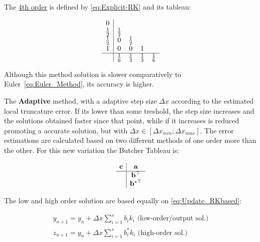 The \underline{ 4th order} is defined by \ref{eq:Explicit-RK} and its tableau:

\begin{equation}
    \begin{array}{c|cccc}
        0\\
        \frac{1}{2} & \frac{1}{2}\\
        \frac{1}{2} & 0 & \frac{1}{2} \\
        1 & 0 & 0 & 1\\
        \hline
        & \frac{1}{6} & \frac{1}{3} & \frac{1}{3} & \frac{1}{6}  
    \end{array}
    \label{eq:RK4_Tableu}
\end{equation}

Although this method solution is slower comparatively to Euler~\ref{eq:Euler_Method}, its accuracy is higher. \par
The \textbf{Adaptive } \label{subsubsub:RK_Adaptive} method, with a adaptive step size \(\Delta x\) according to the estimated local truncature error. If its lower than some treshold, the step size increases and the solutions obtained faster since that point, while if it increases is reduced promoting a accurate solution, but with \(\Delta x \in [\Delta x_{min}; \Delta x_{max}]\).  The error estimations are calculated based on two different methods of one order more than the other. For this new  variation the Butcher Tableau is: 


\begin{equation} 
    \begin{array}{c|c}
        \mathbf{c} & \mathbf{a} \\
        \hline
        & \mathbf{b}^\top  \\
        & \mathbf{b}^{*\top }
    \end{array}
    \label{eq:Explicit_Butcher_Tableu}
\end{equation}


The low and high order solution are based equally on \ref{eq:Update_RKbased}:

\begin{subequations}
    \begin{align}
        y_{n+1} = y_n + \Delta x \sum^{s}_{i=1}b_i k_i \text{  (low-order/output sol.)} \label{eq:Update_Output_adaptiveRK} \\
        z_{n+1} = y_n + \Delta x \sum^{s}_{i=1}b^*_i k_i \text{  (high-order sol.)} \label{eq:Update_HighOrder_adaptiveRK} 
    \end{align}
    \label{eq:Update_Adaptive-RK}  
\end{subequations}

